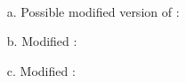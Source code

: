 \begin{exe}[2.52]
    \ \vspace{-20pt}
    \begin{itemize}
        \item[a.] Possible modified version of :
        \item[b.] Modified :
        \item[c.] Modified :
    \end{itemize}
\end{exe}
